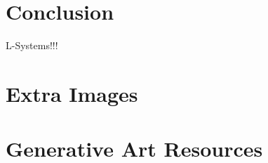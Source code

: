 \documentclass[12pt,twoside]{reedthesis}
\begin{document}


\chapter{Conclusion}
	\setcounter{section}{0}
	
	L-Systems!!!
	
	


    \appendix
      \chapter{Extra Images}
      
      \chapter{Generative Art Resources}

\backmatter 
\nocite{*}


 
\end{document}
